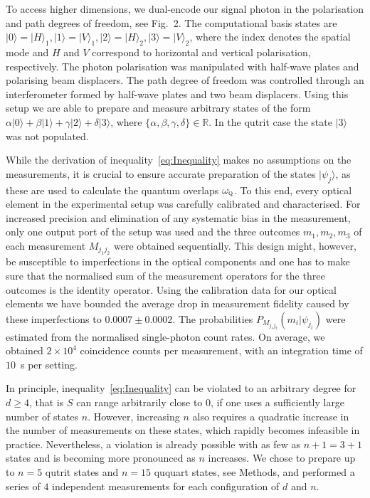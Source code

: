 \documentclass[aps,prl,floatfix,twocolumn,tightenlines,amsmath,amssymb,nofootinbib]{revtex4-1}
\newcommand{\ket}[1] {| #1 \rangle}
\begin{document}
To access higher dimensions, we dual-encode our signal photon in the polarisation and path degrees of freedom\cite{Boschi1998}, see Fig.~2. The computational basis states are $\ket{0}{=}\ket{H}_1, \ket{1}{=}\ket{V}_1, \ket{2}{=}\ket{H}_2, \ket{3}{=}\ket{V}_2$, where the index denotes the spatial mode and $H$ and $V$ correspond to horizontal and vertical polarisation, respectively. The photon polarisation was manipulated with half-wave plates and polarising beam displacers. The path degree of freedom was controlled through an interferometer formed by half-wave plates and two beam displacers. Using this setup we are able to prepare and measure arbitrary states of the form $\alpha\ket 0 + \beta \ket 1+\gamma \ket 2 +\delta \ket 3$, where $\{\alpha,\beta,\gamma,\delta\}\in\mathds{R}$. In the qutrit case the state $\ket 3$ was not populated.

While the derivation of inequality~\eqref{eq:Inequality} makes no assumptions on the measurements\cite{Branciard2014a}, it is crucial to ensure accurate preparation of the states $\ket{\psi_j}$, as these are used to calculate the quantum overlaps $\omega_{\textsc{q}}$. To this end, every optical element in the experimental setup was carefully calibrated and characterised.
For increased precision and elimination of any systematic bias in the measurement, only one output port of the setup was used and the three outcomes $m_1,m_2,m_3$ of each measurement $M_{j_1j_2}$ were obtained sequentially. This design might, however, be susceptible to imperfections in the optical components and one has to make sure that the normalised sum of the measurement operators for the three outcomes is the identity operator.
Using the calibration data for our optical elements we have bounded the average drop in measurement fidelity caused by these imperfections to $0.0007 \pm 0.0002$. The probabilities $P_{M_{j_1j_2}}(m_i | \psi_{j_i})$ were estimated from the normalised single-photon count rates. On average, we obtained $2\times 10^4$ coincidence counts per measurement, with an integration time of $10$~s per setting.

In principle\cite{Branciard2014a}, inequality~\eqref{eq:Inequality} can be violated to an arbitrary degree for $d\geq 4$, that is $S$ can range arbitrarily close to $0$, if one uses a sufficiently large number of states $n$.
However, increasing $n$ also requires a quadratic increase in the number of measurements on these states, which rapidly becomes infeasible in practice. 
Nevertheless, a violation is already possible with as few as $n{+}1{=}3{+}1$ states and is becoming more pronounced as $n$ increases. We chose to prepare up to $n{=}5$ qutrit states and $n{=}15$ ququart states, see Methods, and performed a series of $4$ independent measurements for each configuration of $d$ and $n$. 
\end{document}
